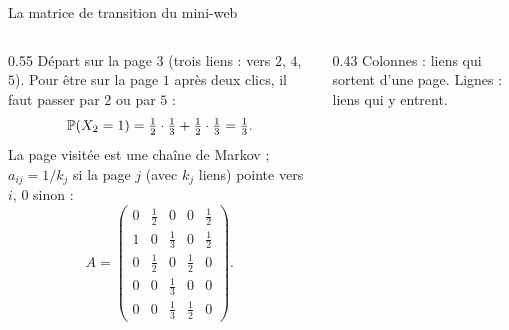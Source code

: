 \begin{frame}{La matrice de transition du mini-web}
  \begin{columns}[c]
    \begin{column}{0.55\textwidth}
      \small Départ sur la page $3$ (trois liens : vers $2$, $4$, $5$).
      Pour être sur la page $1$ après deux clics, il faut passer par $2$
      ou par $5$ :
      \[
        \P{X_2=1} = \tfrac12\cdot\tfrac13+\tfrac12\cdot\tfrac13 = \tfrac13.
      \]
      La page visitée est une chaîne de Markov ; $a_{ij}=1/k_j$ si la page
      $j$ (avec $k_j$ liens) pointe vers $i$, $0$ sinon :
      \[
        A = \begin{pmatrix}
          0 & \tfrac12 & 0 & 0 & \tfrac12\\[2pt]
          1 & 0 & \tfrac13 & 0 & \tfrac12\\[2pt]
          0 & \tfrac12 & 0 & \tfrac12 & 0\\[2pt]
          0 & 0 & \tfrac13 & 0 & 0\\[2pt]
          0 & 0 & \tfrac13 & \tfrac12 & 0
        \end{pmatrix}.
      \]
    \end{column}
    \begin{column}{0.43\textwidth}
      \small Colonnes : liens qui sortent d'une page. Lignes : liens qui
      y entrent.
    \end{column}
  \end{columns}
\end{frame}

